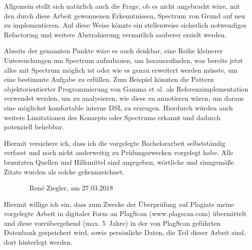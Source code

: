 \documentclass[12pt,oneside,a4paper,parskip]{scrbook}
\def\BaAuthor{René Ziegler}
\def\BaDeadline{27.03.2018}
\begin{document}
Allgemein stellt sich natürlich auch die Frage, ob es nicht angebracht wäre, mit den durch diese Arbeit gewonnenen Erkenntnissen, Spectrum von Grund auf neu zu implementieren. Auf diese Weise könnte ein stellenweise sicherlich notwendiges Refactoring und weitere Abstrahierung vermutlich sauberer erzielt werden.

Abseits der genannten Punkte wäre es auch denkbar, eine Reihe kleinerer Untersuchungen um Spectrum aufzubauen, um herauszufinden, was bereits jetzt alles mit Spectrum möglich ist oder wie es genau erweitert werden müsste, um eine bestimmte Aufgabe zu erfüllen. Zum Beispiel könnten die Pattern objektorientierter Programmierung von Gamma et al. als Referenzimplementation verwendet werden, um zu analysieren, wie diese zu annotieren wären, um daraus eine möglichst komfortable interne DSL zu erzeugen. Hierdurch würden auch weitere Limitationen des Konzepts oder Spectrums erkannt und dadurch potenziell behebbar.

\appendix

\backmatter

\listoffigures
{}


\lstlistoflistings
{}

\printbibliography
{}



Hiermit versichere ich, dass ich die vorgelegte Bachelorarbeit selbstständig verfasst und noch nicht anderweitig zu Prüfungszwecken vorgelegt habe. Alle benutzten Quellen und Hilfsmittel sind angegeben, wörtliche und sinngemäße Zitate wurden als solche gekennzeichnet.

\vspace{20pt}
\begin{flushright}
$\overline{~~~~~~~~~~~~~~~~~\mbox{\BaAuthor, am \BaDeadline}~~~~~~~~~~~~~~~~~}$
\end{flushright}


Hiermit willige ich ein, dass zum Zwecke der Überprüfung auf Plagiate meine vorgelegte Arbeit in digitaler Form an PlagScan (www.plagscan.com) übermittelt und diese vorrübergehend (max. 5~Jahre) in der von PlagScan geführten Datenbank gespeichert wird, sowie persönliche Daten, die Teil dieser Arbeit sind, dort hinterlegt werden.
\end{document}
